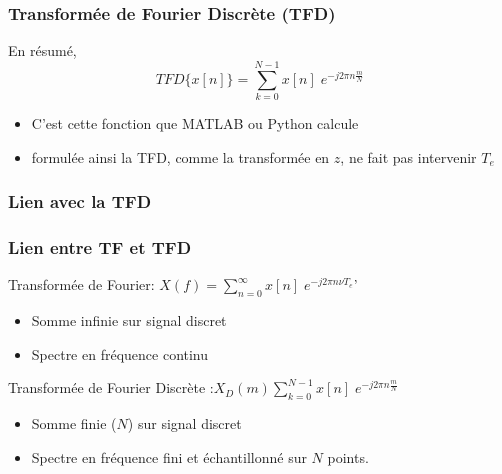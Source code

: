 \documentclass{beamer}
\begin{document}
\begin{frame}
\frametitle{Transformée de Fourier Discrète (TFD)}
En résumé,\\
\vspace{0.3cm} 
\[ TFD\{ x[n] \} =  \sum_{k = 0}^{N-1} x[n] \; e^{-j 2 \pi n \frac{m}{N}}  \] 

\vspace{0.3cm}
\begin{itemize}
\item<2-> C'est cette fonction que MATLAB ou Python calcule
\item<3-> formulée ainsi la TFD, comme la transformée en $z$, ne fait pas intervenir $T_e$  
\end{itemize}

\end{frame}

\subsubsection{Lien avec la TFD}
\begin{frame} 
\frametitle{Lien entre TF et TFD}

Transformée de Fourier: $X(f) = \sum_{n = 0}^{\infty} x[n] \; e^{-j 2 \pi n \nu T_e}$' 
\begin{itemize}
\item<2-> Somme infinie sur signal discret
\item<3-> Spectre en fréquence continu 
\end{itemize}
\vspace{1cm}
Transformée de Fourier Discrète :$X_D(m) \sum_{k = 0}^{N-1} x[n] \; e^{-j 2 \pi n \frac{m}{N} }$
\begin{itemize}
\item<2-> Somme finie ($N$) sur signal discret 
\item<3-> Spectre en fréquence fini et échantillonné sur $N$ points.
\end{itemize}

\end{frame}
\end{document}
